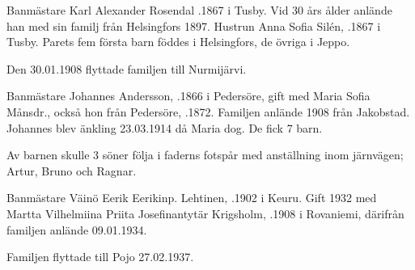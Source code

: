 Banmästare Karl Alexander Rosendal .1867 i Tusby. Vid 30 års ålder anlände han med sin familj från Helsingfors 1897. Hustrun Anna Sofia Silén, .1867 i Tusby. Parets fem första barn föddes i Helsingfors, de övriga i Jeppo.
\begin{jhchildren}
  \item {}
  \item {}
  \item {}
  \item {}
  \item {}
  \item {}
  \item {}
  \item {}
  \item {}
\end{jhchildren}
Den 30.01.1908 flyttade familjen till Nurmijärvi.

Banmästare Johannes Andersson, .1866 i Pedersöre, gift med Maria Sofia Månsdr., också hon från Pedersöre, .1872. Familjen anlände 1908 från Jakobstad. Johannes blev änkling 23.03.1914 då Maria dog. De fick 7 barn.
\begin{jhchildren}
  \item {}
  \item {}
  \item {}
  \item {}
  \item {}
  \item {}
  \item {}
\end{jhchildren}
Av barnen skulle 3 söner följa i faderns fotspår med anställning inom järnvägen; Artur, Bruno och Ragnar.


Banmästare Väinö Eerik Eerikinp. Lehtinen, .1902 i Keuru. Gift 1932 med Martta Vilhelmiina Priita Josefinantytär Krigsholm, .1908 i Rovaniemi, därifrån familjen anlände 09.01.1934.
\begin{jhchildren}
  \item {}
  \item {}
\end{jhchildren}
Familjen flyttade till Pojo 27.02.1937.



